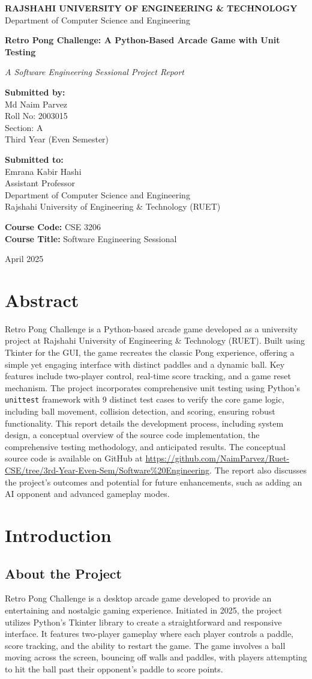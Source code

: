 \documentclass[12pt,a4paper]{article}
\newcommand{\maketitlepage}{
    \begin{titlepage}
        \centering
        \vspace*{0.5cm}
        {\Huge \textbf{RAJSHAHI UNIVERSITY OF ENGINEERING \& TECHNOLOGY}}
        \vspace*{0.5cm}
        {\Large Department of Computer Science and Engineering}
        
        \vspace*{2.5cm}
        
        {\huge\bfseries Retro Pong Challenge: A Python-Based Arcade Game with Unit Testing\par}
        \vspace{0.5cm}
        {\Large \textit{A Software Engineering Sessional Project Report}\par} %
        
        \vspace{2cm}
        
        \begin{flushleft}
        \large \textbf{Submitted by:}\\
        \large Md Naim Parvez \\
        \large Roll No: 2003015 \\
        \large Section: A \\
        \large Third Year (Even Semester) \\ %
        \end{flushleft}
        
        \vspace{1cm}
        
        \begin{flushleft}
        \large \textbf{Submitted to:}\\
        \large Emrana Kabir Hashi \\
        \large Assistant Professor \\
        \large Department of Computer Science and Engineering \\
        \large Rajshahi University of Engineering \& Technology (RUET) \\
        \end{flushleft}
        
        \vspace{1cm}
        {\large \textbf{Course Code:} CSE 3206} \\
        {\large \textbf{Course Title:} Software Engineering Sessional}
        
        \vfill 
        
        {\large April 2025\par} %
    \end{titlepage}
}
\begin{document}
\maketitlepage
\thispagestyle{empty} %

\newpage
{} %
\tableofcontents
\newpage
{} %
\setcounter{page}{1} %

\section*{Abstract} %

Retro Pong Challenge is a Python-based arcade game developed as a university project at Rajshahi University of Engineering \& Technology (RUET). Built using Tkinter for the GUI, the game recreates the classic Pong experience, offering a simple yet engaging interface with distinct paddles and a dynamic ball. Key features include two-player control, real-time score tracking, and a game reset mechanism. The project incorporates comprehensive unit testing using Python's \texttt{unittest} framework with 9 distinct test cases to verify the core game logic, including ball movement, collision detection, and scoring, ensuring robust functionality. This report details the development process, including system design, a conceptual overview of the source code implementation, the comprehensive testing methodology, and anticipated results. The conceptual source code is available on GitHub at \url{https://github.com/NaimParvez/Ruet-CSE/tree/3rd-Year-Even-Sem/Software%20Engineering}. The report also discusses the project's outcomes and potential for future enhancements, such as adding an AI opponent and advanced gameplay modes.

\section{Introduction}
\subsection{About the Project}
Retro Pong Challenge is a desktop arcade game developed to provide an entertaining and nostalgic gaming experience. Initiated in 2025, the project utilizes Python's Tkinter library to create a straightforward and responsive interface. It features two-player gameplay where each player controls a paddle, score tracking, and the ability to restart the game. The game involves a ball moving across the screen, bouncing off walls and paddles, with players attempting to hit the ball past their opponent's paddle to score points.
\end{document}
